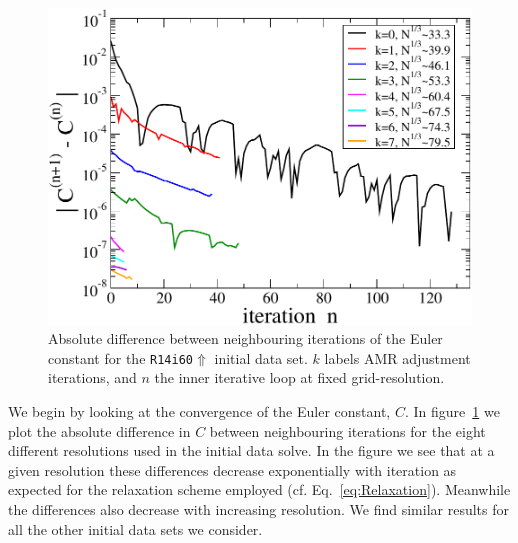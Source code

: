 \setcounter{figure}{1}
\begin{figure}
\centerline{\includegraphics[scale=0.95]{chap4/EulerConv}}
\caption[Convergence of the Euler constant.]{\label{Fig:EulerConv}
Absolute difference between neighbouring iterations of the Euler
constant for the {\tt R14i60$\Uparrow$} initial data set. $k$ labels AMR adjustment iterations, and $n$ the inner iterative loop at fixed grid-resolution.}
\end{figure}

We begin by looking at the convergence of the Euler constant, $C$. In figure~\ref{Fig:EulerConv} we plot the absolute difference in $C$ between neighbouring iterations for the eight
different resolutions used in the initial data solve. 
In the figure we see that at a given resolution these differences
decrease exponentially with iteration as expected for the relaxation
scheme employed (cf. Eq.~\ref{eq:Relaxation}). Meanwhile the differences also decrease with increasing resolution. 
We find similar results for all the other initial data sets we
consider.

